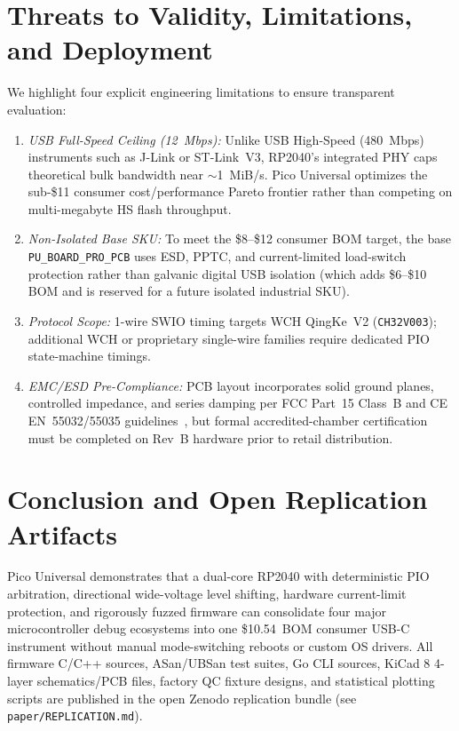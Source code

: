 \documentclass[journal]{IEEEtran}
\begin{document}
\section{Threats to Validity, Limitations, and Deployment}
\label{sec:threats}
We highlight four explicit engineering limitations to ensure transparent evaluation:
\begin{enumerate}
  \item \emph{USB Full-Speed Ceiling (12~Mbps):} Unlike USB High-Speed (480~Mbps) instruments such as J-Link or ST-Link~V3, RP2040's integrated PHY caps theoretical bulk bandwidth near $\sim$1~MiB/s. Pico Universal optimizes the sub-\$11 consumer cost/performance Pareto frontier rather than competing on multi-megabyte HS flash throughput.
  \item \emph{Non-Isolated Base SKU:} To meet the \$8--\$12 consumer BOM target, the base \texttt{PU\_BOARD\_PRO\_PCB} uses ESD, PPTC, and current-limited load-switch protection rather than galvanic digital USB isolation (which adds \$6--\$10 BOM and is reserved for a future isolated industrial SKU).
  \item \emph{Protocol Scope:} 1-wire SWIO timing targets WCH QingKe~V2 (\texttt{CH32V003}); additional WCH or proprietary single-wire families require dedicated PIO state-machine timings.
  \item \emph{EMC/ESD Pre-Compliance:} PCB layout incorporates solid ground planes, controlled impedance, and series damping per FCC Part~15 Class~B and CE EN~55032/55035 guidelines~\cite{fcc_part15,en55032}, but formal accredited-chamber certification must be completed on Rev~B hardware prior to retail distribution.
\end{enumerate}

\section{Conclusion and Open Replication Artifacts}
\label{sec:conclusion}
Pico Universal demonstrates that a dual-core RP2040 with deterministic PIO arbitration, directional wide-voltage level shifting, hardware current-limit protection, and rigorously fuzzed firmware can consolidate four major microcontroller debug ecosystems into one \$10.54~BOM consumer USB-C instrument without manual mode-switching reboots or custom OS drivers. All firmware C/C++ sources, ASan/UBSan test suites, Go CLI sources, KiCad 8 4-layer schematics/PCB files, factory QC fixture designs, and statistical plotting scripts are published in the open Zenodo replication bundle (see \texttt{paper/REPLICATION.md}).



\end{document}
